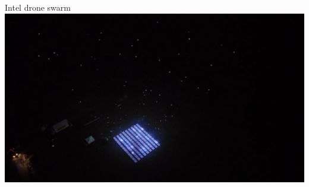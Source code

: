 \documentclass[aspectratio=169]{beamer}
\begin{document}
\begin{frame}{Intel drone swarm}
        	\centering
            \href{run:./videos/Intel.mp4?autostart}
            {\includegraphics[width=.95\linewidth]{images/intel.png}}
           
\end{frame}
\end{document}
